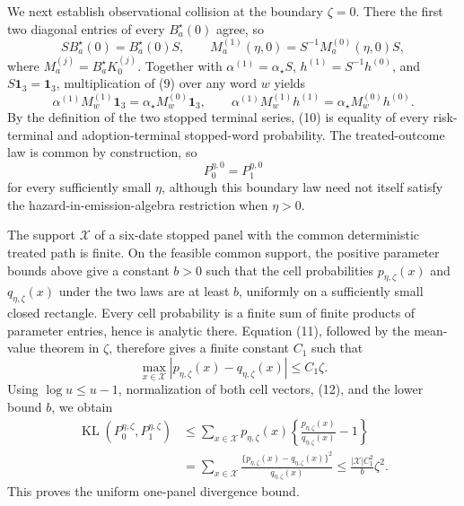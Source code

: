 We next establish observational collision at the boundary \(\zeta=0\). There the first two diagonal entries of every \(B_a^{\star}(0)\) agree, so
\[
 SB_a^{\star}(0)=B_a^{\star}(0)S,
 \qquad
 M_a^{(1)}(\eta,0)=S^{-1}M_a^{(0)}(\eta,0)S,                 \tag{9}
\]
where \(M_a^{(j)}=B_a^{\star}K_0^{(j)}\). Together with \(\alpha^{(1)}=\alpha_{\star}S\), \(h^{(1)}=S^{-1}h^{(0)}\), and \(S\mathbf 1_3=\mathbf 1_3\), multiplication of (9) over any word \(w\) yields
\[
 \alpha^{(1)}M_w^{(1)}\mathbf 1_3
 =\alpha_{\star}M_w^{(0)}\mathbf 1_3,
 \qquad
 \alpha^{(1)}M_w^{(1)}h^{(1)}
 =\alpha_{\star}M_w^{(0)}h^{(0)}.                            \tag{10}
\]
By the definition of the two stopped terminal series, (10) is equality of every risk-terminal and adoption-terminal stopped-word probability. The treated-outcome law is common by construction, so
\[
 P_0^{\eta,0}=P_1^{\eta,0}                                  \tag{11}
\]
for every sufficiently small \(\eta\), although this boundary law need not itself satisfy the hazard-in-emission-algebra restriction when \(\eta>0\).

The support \(\mathcal X\) of a six-date stopped panel with the common deterministic treated path is finite. On the feasible common support, the positive parameter bounds above give a constant \(b>0\) such that the cell probabilities \(p_{\eta,\zeta}(x)\) and \(q_{\eta,\zeta}(x)\) under the two laws are at least \(b\), uniformly on a sufficiently small closed rectangle. Every cell probability is a finite sum of finite products of parameter entries, hence is analytic there. Equation (11), followed by the mean-value theorem in \(\zeta\), therefore gives a finite constant \(C_1\) such that
\[
 \max_{x\in\mathcal X}|p_{\eta,\zeta}(x)-q_{\eta,\zeta}(x)|
 \le C_1\zeta.                                               \tag{12}
\]
Using \(\log u\le u-1\), normalization of both cell vectors, (12), and the lower bound \(b\), we obtain
\[
 \begin{aligned}
 \operatorname{KL}(P_0^{\eta,\zeta},P_1^{\eta,\zeta})
 &\le \sum_{x\in\mathcal X}p_{\eta,\zeta}(x)
       \left\{\frac{p_{\eta,\zeta}(x)}{q_{\eta,\zeta}(x)}-1\right\}\\
 &=\sum_{x\in\mathcal X}
   \frac{\{p_{\eta,\zeta}(x)-q_{\eta,\zeta}(x)\}^2}
        {q_{\eta,\zeta}(x)}
 \le \frac{|\mathcal X|C_1^2}{b}\zeta^2.                   \tag{13}
 \end{aligned}
\]
This proves the uniform one-panel divergence bound.


